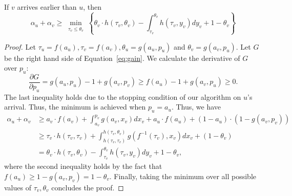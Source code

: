 \begin{lemma}
\label{lem:vearlier}
If $v$ arrives earlier than $u$, then
\begin{equation}
\label{eq:vearlier}
	\alpha_u + \alpha_v \ge \min_{\substack{\tau_v \le \theta_v}} \left\{ \theta_v \cdot h(\tau_v, \theta_v) - \int_{\tau_v}^{\theta_v} h(\tau_v, y_v) dy_v + 1 - \theta_v \right\}
\end{equation}
\end{lemma}

\begin{proof}
Let $\tau_u = f(a_u), \tau_v = f(a_v), \theta_u = g(a_u,p_u)$ and $\theta_v = g(a_v,p_u)$. Let $G$ be the right hand side of Equation~\eqref{eq:gain}. We calculate the derivative of $G$ over $p_u$:
\[
\frac{\partial G}{\partial p_u} = g(a_u, p_u) - 1 + g(a_v, p_v) \ge f(a_u) - 1 + g(a_v,p_u) \ge 0.
\]
The last inequality holds due to the stopping condition of our algorithm on $u$'s arrival. Thus, the minimum is achieved when $p_u=a_u$. Thus, we have
\begin{align*}
\alpha_u+\alpha_v & \ge a_v \cdot f(a_v) + \int_{a_v}^{p_v} g(a_v, x_v) dx_v + a_u \cdot f(a_u) + (1-a_u) \cdot (1-g(a_v, p_v)) \\
& \ge \tau_v \cdot h(\tau_v, \tau_v) + \int_{h(\tau_v,\tau_v)}^{h(\tau_v, \theta_v)} g(f^{-1}(\tau_v), x_v) dx_v +(1-\theta_v) \\
& = \theta_v \cdot h(\tau_v, \theta_v) - \int_{\tau_v}^{\theta_v} h(\tau_v, y_v) dy_v +1-\theta_v,
\end{align*}
where the second inequality holds by the fact that $f(a_u) \ge 1-g(a_v,p_v) = 1-\theta_v$.
Finally, taking the minimum over all possible values of $\tau_v,\theta_v$ concludes the proof.
\end{proof}


